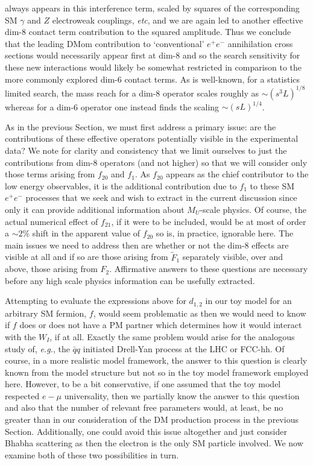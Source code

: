 \documentclass[14pt]{article}
\def\eg{{\it e.g.}}
\def\etc{{\it etc}}
\begin{document}
{%
always appears in this interference term, scaled by squares of the corresponding SM $\gamma$ and $Z$ electroweak couplings, \etc, and we are again led to another effective dim-8 contact term 
contribution to the 
squared amplitude.  Thus we conclude that the leading DMom contribution to `conventional' $e^+e^-$ annihilation cross sections would necessarily appear first at dim-8 and so the search sensitivity 
for these new interactions would likely be somewhat restricted in comparison to the more commonly explored dim-6 contact terms. As is well-known\cite{Rizzo:2003sz}, for a statistics limited 
search, the mass reach for a dim-8 operator scales roughly as $\sim (s^3L)^{1/8}$ whereas for a dim-6 operator one instead finds the scaling $\sim (sL)^{1/4}$.

As in the previous Section, we must first address a primary issue: are the contributions of these effective operators potentially visible in the experimental data? 
We note for clarity and consistency that we limit ourselves to just the contributions from dim-8 operators (and not higher) so that we will consider only those terms arising from $f_{20}$ and $f_1$. As 
$f_{20}$ appears as the chief contributor to the low energy observables, it is the additional contribution due to $f_1$ to these SM $e^+e^-$  processes that we seek and wish to extract in the 
current discussion since only it can provide additional information about $M_U$-scale physics. Of course, the actual numerical effect of $f_{21}$, if it were to be included, would be at most of order a 
$\sim 2\%$ shift in the apparent value of $f_{20}$ so is, in practice, ignorable here. The main issues we need to address then are whether or not the dim-8 effects are visible at all and if so are those 
arising from $\tilde F_1$ separately visible, over and above, those arising from $F_2$. Affirmative answers to these questions are necessary before any high scale physics information can be 
usefully extracted.

Attempting to evaluate the expressions above for $d_{1,2}$ in our toy model for an arbitrary SM fermion, $f$, would seem problematic as then we would need to know if $f$ does or does not have a 
PM partner which determines how it would interact with the $W_I$, if at all. Exactly the same problem would arise for the analogous study of, \eg,  the $\bar q q$ initiated Drell-Yan process at 
the LHC or FCC-hh.  Of course, in a more realistic model framework, the answer to this question is clearly known from the model structure but not so in the toy model framework employed here. 
However, to be a bit conservative, if one assumed that the toy model respected $e-\mu$ universality, then we partially know the answer to this question and also that the number of relevant free 
parameters would, at least, be no greater than in our consideration of the DM production process in the previous Section. Additionally, one could avoid this issue altogether and just consider 
Bhabha scattering as then the electron is the only SM particle involved. We now examine both of these two possibilities in turn.

}
\end{document}
